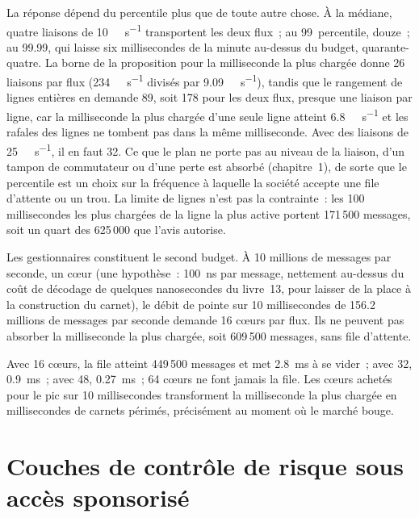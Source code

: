 La réponse dépend du percentile plus que de toute autre chose. À la médiane, quatre liaisons de \qty{10}{\giga\bit\per\second} transportent
les deux flux~; au 99~percentile, douze~; au 99.99, qui laisse six millisecondes de la minute au-dessus du budget,
quarante-quatre. La borne de la proposition pour la milliseconde la plus chargée donne 26 liaisons par flux (\qty{234}{\giga\bit\per\second}
divisés par \qty{9.09}{\giga\bit\per\second}), tandis que le rangement de lignes entières en demande 89, soit 178 pour les deux flux, presque une liaison par ligne, car
la milliseconde la plus chargée d'une seule ligne atteint \qty{6.8}{\giga\bit\per\second} et les rafales des lignes ne tombent pas dans la même milliseconde.
Avec des liaisons de \qty{25}{\giga\bit\per\second}, il en faut 32. Ce que le plan ne porte pas au niveau de la liaison, d'un
tampon de commutateur ou d'une perte est absorbé (chapitre~1), de sorte que le percentile est un choix sur la fréquence à laquelle la société accepte une file d'attente ou un trou.
La limite de lignes n'est pas la contrainte~: les 100 millisecondes les plus chargées de la ligne la plus active portent 171\,500 messages, soit un quart des
625\,000 que l'avis autorise.

Les gestionnaires constituent le second budget. À 10 millions de messages par seconde, un cœur (une hypothèse~: \qty{100}{\nano\second} par message, nettement au-dessus
du coût de décodage de quelques nanosecondes du livre~13, pour laisser de la place à la construction du carnet), le débit de pointe sur 10 millisecondes de 156.2 millions de messages par seconde
demande 16 cœurs par flux. Ils ne peuvent pas absorber la milliseconde la plus chargée, soit 609\,500 messages, sans file d'attente.

\label{lst:nw:equities-and-options-connectivity:backlog}

Avec 16 cœurs, la file atteint 449\,500 messages et met \qty{2.8}{\milli\second} à se vider~; avec 32, \qty{0.9}{\milli\second}~;
avec 48, \qty{0.27}{\milli\second}~; 64 cœurs ne font jamais la file. Les cœurs achetés pour le pic sur 10 millisecondes transforment la milliseconde la plus chargée
en millisecondes de carnets périmés, précisément au moment où le marché bouge.

\section{Couches de contrôle de risque sous accès sponsorisé}

